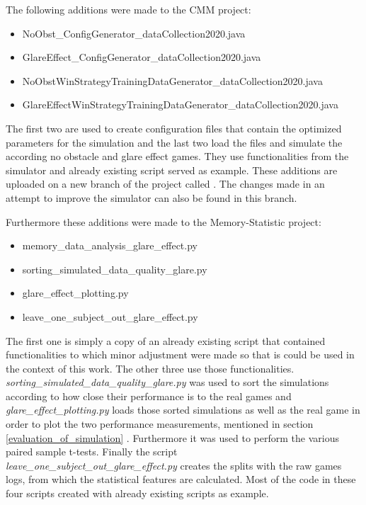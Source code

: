 The following additions were made to the CMM project:
\begin{itemize}
	\item NoObst\_ConfigGenerator\_dataCollection2020.java
	\item GlareEffect\_ConfigGenerator\_dataCollection2020.java
	\item NoObstWinStrategyTrainingDataGenerator\_dataCollection2020.java
	\item GlareEffectWinStrategyTrainingDataGenerator\_dataCollection2020.java
\end{itemize}
The first two are used to create configuration files that contain the optimized parameters for the simulation and the last two load the files and simulate the according no obstacle and glare effect games. They use functionalities from the simulator and already existing script served as example. These additions are uploaded on a new branch of the project called . The changes made in an attempt to improve the simulator can also be found in this branch. 

Furthermore these additions were made to the Memory-Statistic project: 
\begin{itemize}
	\item memory\_data\_analysis\_glare\_effect.py
	\item sorting\_simulated\_data\_quality\_glare.py
	\item glare\_effect\_plotting.py
	\item leave\_one\_subject\_out\_glare\_effect.py
\end{itemize}
The first one is simply a copy of an already existing script that contained functionalities to which minor adjustment were made so that is could be used in the context of this work. The other three use those functionalities.\\ \textit{sorting\_simulated\_data\_quality\_glare.py} was used to sort the simulations according to how close their performance is to the real games and \textit{glare\_effect\_plotting.py} loads those sorted simulations as well as the real game in order to plot the two performance measurements, mentioned in section \ref{evaluation_of_simulation} . Furthermore it was used to perform the various paired sample t-tests. Finally the script\\ \textit{leave\_one\_subject\_out\_glare\_effect.py} creates the splits with the raw games logs, from which the statistical features are calculated. Most of the code in these four scripts created with already existing scripts as example. 

